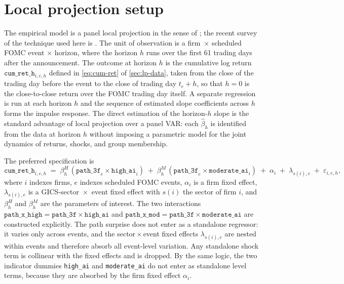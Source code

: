 \section{Local projection setup}
\label{sec:emp-lp}

The empirical model is a panel local projection in the sense of \citet{jorda2005}; the recent survey of the technique used here is \citet{jordaTaylor2025}. The unit of observation is a firm~$\times$ scheduled FOMC event $\times$ horizon, where the horizon $h$ runs over the first 61 trading days after the announcement. The outcome at horizon $h$ is the cumulative log return $\mathtt{cum\_ret\_h}_{i,e,h}$ defined in \cref{eq:cum-ret} of \cref{sec:lp-data}, taken from the close of the trading day before the event to the close of trading day $t_e + h$, so that $h = 0$ is the close-to-close return over the FOMC trading day itself. A separate regression is run at each horizon $h$ and the sequence of estimated slope coefficients across $h$ forms the impulse response. The direct estimation of the horizon-$h$ slope is the standard advantage of local projection over a panel VAR: each $\hat\beta_h$ is identified from the data at horizon $h$ without imposing a parametric model for the joint dynamics of returns, shocks, and group membership.

The preferred specification is
\begin{equation}
    \mathtt{cum\_ret\_h}_{i,e,h} \;=\; \beta_h^H \, (\mathtt{path\_3f}_e \times \mathtt{high\_ai}_i) \;+\; \beta_h^M \, (\mathtt{path\_3f}_e \times \mathtt{moderate\_ai}_i) \;+\; \alpha_i \;+\; \lambda_{s(i),e} \;+\; \varepsilon_{i,e,h},
    \label{eq:lp-preferred}
\end{equation}
where $i$ indexes firms, $e$ indexes scheduled FOMC events, $\alpha_i$ is a firm fixed effect, $\lambda_{s(i),e}$ is a GICS-sector~$\times$~event fixed effect with $s(i)$ the sector of firm $i$, and $\beta_h^H$ and $\beta_h^M$ are the parameters of interest. The two interactions $\mathtt{path\_x\_high} = \mathtt{path\_3f} \times \mathtt{high\_ai}$ and $\mathtt{path\_x\_mod} = \mathtt{path\_3f} \times \mathtt{moderate\_ai}$ are constructed explicitly. The path surprise does not enter as a standalone regressor: it varies only across events, and the sector\,$\times$\,event fixed effects $\lambda_{s(i),e}$ are nested within events and therefore absorb all event-level variation. Any standalone shock term is collinear with the fixed effects and is dropped. By the same logic, the two indicator dummies \texttt{high\_ai} and \texttt{moderate\_ai} do not enter as standalone level terms, because they are absorbed by the firm fixed effect $\alpha_i$.

